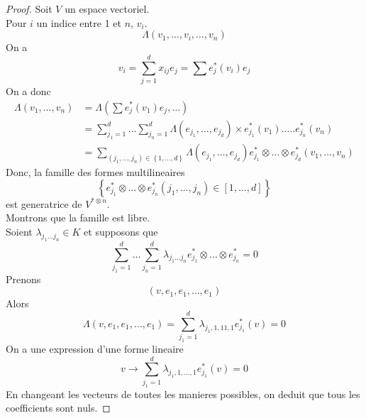 \documentclass[../main.tex]{subfiles}
\begin{document}
\begin{proof}
Soit $V$ un espace vectoriel.\\
Pour $i$ un indice entre 1 et $n$, $v_i$.\\
\[ 
	\Lambda( v_1, \ldots, v_i, \ldots , v_n) 
\]
On a 
\[ 
	v_i = \sum_{j=1}^{ d}x_{ij} e_j = \sum e_{j} ^{*}( v_i) e_j
\]
On a donc
\begin{align*}
	\Lambda( v_1, \ldots, v_n) &= \Lambda\left( \sum e_j^{* }( v_1) e_j, \ldots\right) \\
				   &= \sum_{j_1=1}^{d } \ldots \sum_{j_n=1}^{ d} \Lambda( e_{j_1} , \ldots, e_{j_d} ) \times  e^{*}_{j_1} ( v_1) . \ldots . e_{j_n} ^{*}( v_n) \\
				   &= \sum_{( j_1, \ldots, j_n) \in \left\{ 1,\ldots, d \right\}  } \Lambda( e_{j_1} , \ldots, e_{j_d} ) e_{j_1} ^{*}\otimes \ldots \otimes e_{j_d} ^{*}( v_1,\ldots, v_n) 
\end{align*}
Donc, la famille des formes multilineaires
\[ 
	\left\{ e_{j_1} ^{*}\otimes \ldots \otimes e_{j_n} ^{*} ( j_1, \ldots, j_n) \in [ 1,\ldots, d] 	  \right\} 
\]
est generatrice de $V^{*\otimes n}$.\\
Montrons que la famille est libre.\\
Soient $\lambda_{j_1 \ldots j_n	} \in K	 $ et supposons que 
\[ 
\sum_{j_1=1}^{ d}\ldots \sum_{j_n=1}^{ d} \lambda_{j_1\ldots j_n} e_{j_1} ^{*}\otimes \ldots \otimes e_{j_n} ^{*} = 0
\]
Prenons 
\[ 
	( v, e_1, e_1, \ldots , e_1)
\]
Alors
\[ 
	\Lambda	( v, e_1, e_1, \ldots , e_1) = \sum_{j_1=1}^{ d}\lambda_{j_1, 1,1 1,1} e_{j_1} ^{*}( v) = 0
\]
On a une expression d'une forme lineaire 
\[ 
	v \to \sum_{j_1=1}^{d } \lambda_{j_1, 1,\ldots, 1} e_{j_1} ^{*}( v) =0
\]
En changeant les vecteurs de toutes les manieres possibles, on deduit que tous les coefficients sont nuls.
\end{proof}
\end{document}
